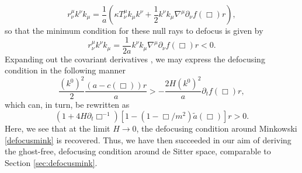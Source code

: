   \[
  r_{\nu}^{\mu}k^{\nu}k_{\mu}=\frac{1}{a}\left(\kappa T_{\nu}^{\mu}k_{\mu}k^{\nu}+\frac{1}{2}k^{\nu}k_{\mu}\nabla^{\mu}\partial_{\nu}f(\Box)r\right),
 \]
 so that the minimum condition for these null rays to defocus is given by
 \[
 r_{\nu}^{\mu}k^{\nu}k_{\mu}=\frac{1}{2a}k^{\nu}k_{\mu}\nabla^{\mu}\partial_{\nu}f(\Box)r<0
 .\]
 Expanding out the covariant derivatives , we may express the defocusing condition in the following manner
 \[
 \frac{(k^{0})^{2}}{2}\frac{(a-c(\Box))r}{a}>-\frac{2H(k^{0})^{2}}{a}\partial_{t}f(\Box)r
, \]
which can, in turn, be rewritten as
\[
\label{defocusdS}
\left(1+4H\partial_{t}\Box^{-1}\right)\left[1-(1-\Box/m^{2})\tilde{a}(\Box)\right]r>0.
\]
Here, we see that at the limit $H\rightarrow 0$, the defocusing condition around Minkowski \eqref{defocusmink} is recovered. Thus, we have then succeeded in our aim of deriving the ghost-free, defocusing condition around de Sitter space, comparable to Section \ref{sec:defocusmink}.
